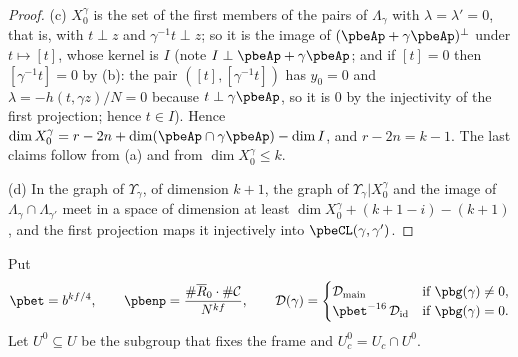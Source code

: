 \documentclass[10pt]{amsart}
\theoremstyle{definition}
\theoremstyle{remark}
\providecommand{\pbDid}{\mathcal D_{\mathrm{id}}}
\providecommand{\pbDmain}{\mathcal D_{\mathrm{main}}}
\providecommand{\pbR}{\overline R_0}
\begin{document}
\begin{proof}
(c) $X_0^\gamma$ is the set of the first members of the pairs of $\Lambda_\gamma$ with $\lambda=
\lambda'=0$, that is, with $t\perp z$ and $\gamma^{-1}t\perp z$; so it is the image of $(\pbeAp+
\gamma\pbeAp)^\perp$ under $t\mapsto[t]$, whose kernel is $I$ (note $I\perp\pbeAp+\gamma\pbeAp$; and if $[t]=0$ then
$[\gamma^{-1}t]=0$ by (b): the pair $([t],[\gamma^{-1}t])$ has $y_0=0$ and $\lambda=-h(t,\gamma z)/N=0$ because $t\perp\gamma\pbeAp$, so it is $0$ by the injectivity of the first projection; hence $t\in I$).
Hence $\dim X_0^\gamma=r-2n+\dim(\pbeAp\cap\gamma\pbeAp)-\dim I$, and $r-2n=k-1$. The last claims
follow from (a) and from $\dim X_0^\gamma\le k$.

(d) In the graph of $\Upsilon_\gamma$, of dimension $k+1$, the graph of $\Upsilon_\gamma|X_0^\gamma$
and the image of $\Lambda_\gamma\cap\Lambda_{\gamma'}$ meet in a space of dimension at least $\dim
X_0^\gamma+(k+1-i)-(k+1)$, and the first projection maps it injectively into $\pbeCL(\gamma,
\gamma')$.
\end{proof}

Put
\[
\pbet=b^{kf/4},\qquad\pbenp=\frac{\#\pbR\cdot\#\mathcal C}{N^{kf}},\qquad\mathcal D(\gamma)=\begin{cases}
\pbDmain&\text{if }\pbg(\gamma)\ne0,\\ \pbet^{-16}\,\pbDid&\text{if }\pbg(\gamma)=0.\end{cases}
\]
Let $U^0\subseteq U$ be the subgroup that fixes the frame and $U_c^0=U_c\cap U^0$.
\end{document}
